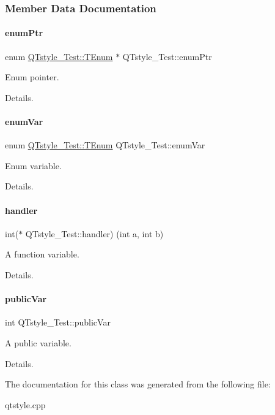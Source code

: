\subsubsection{Member Data Documentation}
\mbox{\label{class_q_tstyle___test_a973a4566c9a036f4eca508ba5fe80dcb}} 
\paragraph{\texorpdfstring{enum\+Ptr}{enumPtr}}
{\footnotesize\ttfamily enum \hyperlink{class_q_tstyle___test_a0525f798cda415a94fedeceb806d2c49}{Q\+Tstyle\+\_\+\+Test\+::\+T\+Enum}
         $\ast$ Q\+Tstyle\+\_\+\+Test\+::enum\+Ptr}



Enum pointer. 

Details. \mbox{\label{class_q_tstyle___test_adb265d815b43f1f7f0de0e8b8852a5d0}} 
\paragraph{\texorpdfstring{enum\+Var}{enumVar}}
{\footnotesize\ttfamily enum \hyperlink{class_q_tstyle___test_a0525f798cda415a94fedeceb806d2c49}{Q\+Tstyle\+\_\+\+Test\+::\+T\+Enum}
          Q\+Tstyle\+\_\+\+Test\+::enum\+Var}



Enum variable. 

Details. \mbox{\label{class_q_tstyle___test_a79dd4e5498f09057775a819d911349e2}} 
\paragraph{\texorpdfstring{handler}{handler}}
{\footnotesize\ttfamily int($\ast$ Q\+Tstyle\+\_\+\+Test\+::handler) (int a, int b)}



A function variable. 

Details. \mbox{\label{class_q_tstyle___test_aabf7b2e9ed83ea44aca4d213baae06d3}} 
\paragraph{\texorpdfstring{public\+Var}{publicVar}}
{\footnotesize\ttfamily int Q\+Tstyle\+\_\+\+Test\+::public\+Var}



A public variable. 

Details. 

The documentation for this class was generated from the following file\+:\begin{DoxyCompactItemize}
\item 
qtstyle.\+cpp\end{DoxyCompactItemize}
